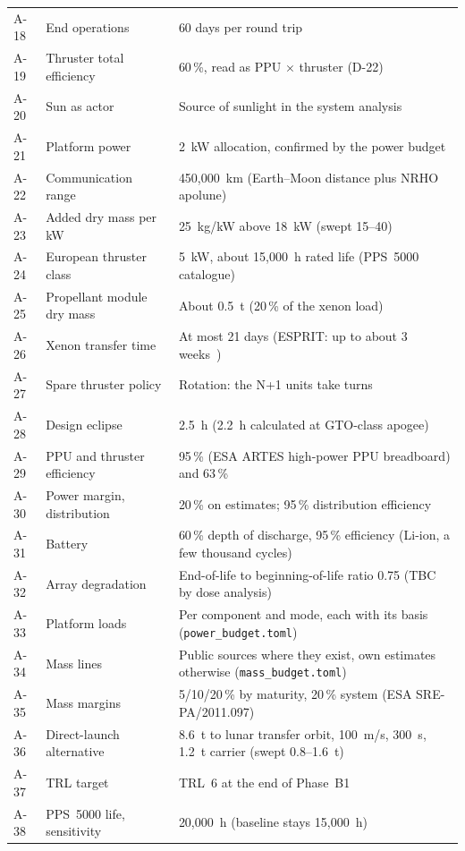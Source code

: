 \documentclass[11pt,a4paper]{article}
\newcommand{\id}[1]{#1}
\begin{document}
{\begin{longtable}{@{}P{1.0cm}P{4.3cm}P{9.8cm}@{}}
\id{A-18} & End operations & 60 days per round trip \\
\id{A-19} & Thruster total efficiency & 60\,\%, read as PPU $\times$ thruster (\id{D-22}) \\
\id{A-20} & Sun as actor & Source of sunlight in the system analysis \\
\id{A-21} & Platform power & 2~kW allocation, confirmed by the power budget \\
\id{A-22} & Communication range & 450,000~km (Earth--Moon distance plus NRHO apolune) \\
\id{A-23} & Added dry mass per kW & 25~kg/kW above 18~kW (swept 15--40) \\
\id{A-24} & European thruster class & 5~kW, about 15,000~h rated life (PPS~5000 catalogue) \\
\id{A-25} & Propellant module dry mass & About 0.5~t (20\,\% of the xenon load) \\
\id{A-26} & Xenon transfer time & At most 21 days (ESPRIT: up to about 3 weeks~\cite{radke}) \\
\id{A-27} & Spare thruster policy & Rotation: the N+1 units take turns \\
\id{A-28} & Design eclipse & 2.5~h (2.2~h calculated at GTO-class apogee) \\
\id{A-29} & PPU and thruster efficiency & 95\,\% (ESA ARTES high-power PPU breadboard) and 63\,\% \\
\id{A-30} & Power margin, distribution & 20\,\% on estimates; 95\,\% distribution efficiency \\
\id{A-31} & Battery & 60\,\% depth of discharge, 95\,\% efficiency (Li-ion, a few thousand cycles) \\
\id{A-32} & Array degradation & End-of-life to beginning-of-life ratio 0.75 (TBC by dose analysis) \\
\id{A-33} & Platform loads & Per component and mode, each with its basis (\texttt{power\_budget.toml}) \\
\id{A-34} & Mass lines & Public sources where they exist, own estimates otherwise (\texttt{mass\_budget.toml}) \\
\id{A-35} & Mass margins & 5/10/20\,\% by maturity, 20\,\% system (ESA SRE-PA/2011.097) \\
\id{A-36} & Direct-launch alternative & 8.6~t to lunar transfer orbit, 100~m/s, 300~s, 1.2~t carrier (swept 0.8--1.6~t) \\
\id{A-37} & TRL target & TRL~6 at the end of Phase~B1 \\
\id{A-38} & PPS~5000 life, sensitivity & 20,000~h (baseline stays 15,000~h) \\
\end{longtable}

}
\end{document}

